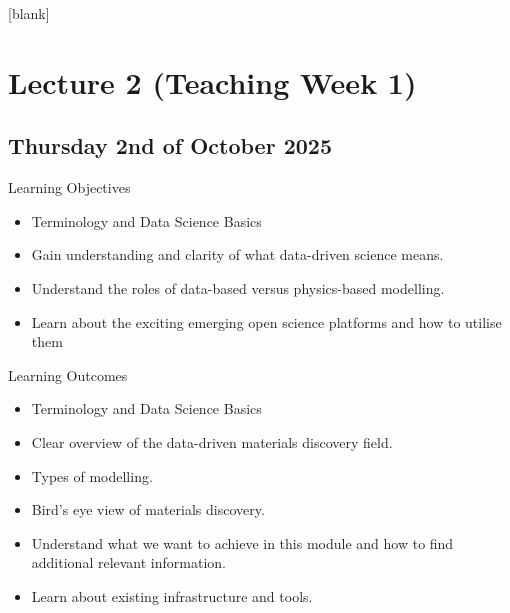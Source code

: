 \documentclass[aspectratio=169]{beamer}
\begin{document}
[blank]


\section{Lecture 2 (Teaching Week 1)}
\subsection{Thursday 2nd of October 2025}








\begin{frame}{Learning Objectives}


\begin{itemize}
  \item Terminology and Data Science Basics
  \item Gain understanding and clarity of what data-driven science means.
  \item Understand the roles of data-based versus physics-based modelling.
  \item Learn about the exciting emerging open science platforms and how to utilise them 
\end{itemize}
\end{frame}


\begin{frame}{Learning Outcomes}
 \begin{itemize}
   \item Terminology and Data Science Basics
  \item Clear overview of the data-driven materials discovery field.
  \item Types of modelling.
  \item Bird's eye view of materials discovery.
  \item Understand what we want to achieve in this module and how to find additional relevant information.
  \item Learn about existing infrastructure and tools.
\end{itemize} 
\end{frame}
\end{document}
